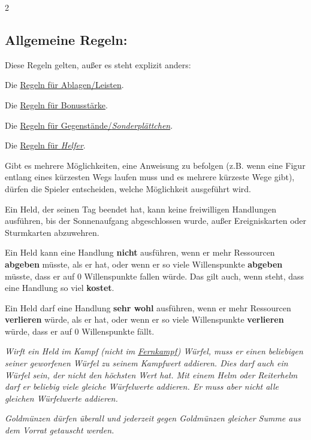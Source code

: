 \documentclass[10pt, a4paper, oneside]{book}
\newcommand{\fan}[1]{\textit{#1}}
\begin{document}
\begin{multicols*}{2}
\begin{nobgcolor}
\subsection{Allgemeine Regeln:}

Diese Regeln gelten, außer es steht explizit anders:

\bullet{} Die \hyperref[ablagen-und-leisten]{Regeln für Ablagen/Leisten}.

\bullet{} Die \hyperref[bonusstaerke]{Regeln für Bonusstärke}.

\bullet{} Die \hyperref[gegenstaende-und-sonderplaettchen]{Regeln für Gegenstände/\fan{Sonderplättchen}}.

\bullet{} Die \hyperref[helfer]{Regeln für \fan{Helfer}}.

\bullet{} Gibt es mehrere Möglichkeiten, eine Anweisung zu befolgen (z.B. wenn eine Figur entlang eines kürzesten Wegs laufen muss und es mehrere kürzeste Wege gibt), dürfen die Spieler entscheiden, welche Möglichkeit ausgeführt wird.

\bullet{} Ein Held, der seinen Tag beendet hat, kann keine freiwilligen Handlungen ausführen, bis der Sonnenaufgang abgeschlossen wurde, außer Ereigniskarten oder Sturmkarten abzuwehren.
\supercite{32754,32768}

\bullet{} Ein Held kann eine Handlung \textbf{nicht} ausführen, wenn er mehr Ressourcen \textbf{abgeben} müsste, als er hat, oder wenn er so viele Willenspunkte \textbf{abgeben} müsste, dass er auf 0 Willenspunkte fallen würde. Das gilt auch, wenn steht, dass eine Handlung so viel \textbf{kostet}.

\bullet{} Ein Held darf eine Handlung \textbf{sehr wohl} ausführen, wenn er mehr Ressourcen \textbf{verlieren} würde, als er hat, oder wenn er so viele Willenspunkte \textbf{verlieren} würde, dass er auf 0 Willenspunkte fällt.

\bullet{} \fan{Wirft ein Held im Kampf (nicht im \hyperref[fernkaempfer]{Fernkampf}) Würfel, muss er einen beliebigen seiner geworfenen Würfel zu seinem Kampfwert addieren. Dies darf auch ein Würfel sein, der nicht den höchsten Wert hat. Mit einem Helm oder Reiterhelm darf er beliebig viele gleiche Würfelwerte addieren. Er muss aber nicht alle gleichen Würfelwerte addieren.}

\bullet{} \fan{Goldmünzen dürfen überall und jederzeit gegen Goldmünzen gleicher Summe aus dem Vorrat getauscht werden. }


\end{nobgcolor}
\end{multicols*}
\end{document}
